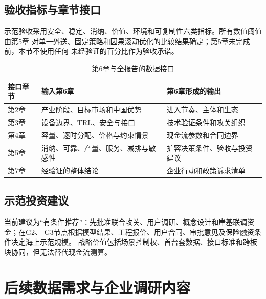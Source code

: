 \subsection{验收指标与章节接口}

示范验收采用安全、稳定、消纳、价值、环境和可复制性六类指标。所有数值阈值由第5章
对单一外送、固定策略和因果滚动优化的比较结果确定；第5章未完成前，本节不使用任何
未经验证的百分比作为验收承诺。

\begin{table}[H]
\centering
\caption{第6章与全报告的数据接口}
\label{tab:c6-chapter-interface}
\begin{tabularx}{\textwidth}{p{2.8cm} X X}
\toprule
接口章节 & 输入第6章 & 第6章形成的输出\\
\midrule
第2章 & 产业阶段、目标市场和中国优势 & 进入节奏、主体和生态\\
第3章 & 设备边界、TRL、安全与接口 & 技术验证条件和攻关组织\\
第4章 & 容量、逐时分配、价格与约束情景 & 现金流参数和合同边界\\
第5章 & 消纳、可靠、产量、服务、减排与敏感性 & 扩容决策条件、验收与投资建议\\
第7章 & 经验证的整体结论 & 企业行动和政策诉求清单\\
\bottomrule
\end{tabularx}
\end{table}

\subsection{示范投资建议}

当前建议为“有条件推荐”：先批准联合攻关、用户调研、概念设计和岸基联调资金；在G2、
G3节点根据模型结果、工程报价、用户合同、审批意见及保险融资条件决定海上示范规模。
战略价值包括场景控制权、首台套数据、接口标准和跨板块协同，但无法替代现金流测算。


\section*{后续数据需求与企业调研内容}

